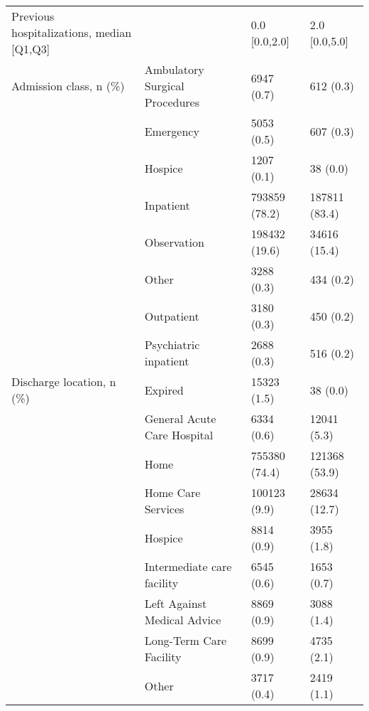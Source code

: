 \begin{tabular}{llll}
Previous hospitalizations, median [Q1,Q3] &   &                  0.0 [0.0,2.0] &     2.0 [0.0,5.0] \\
Admission class, n (\%) & Ambulatory Surgical Procedures &                     6947 (0.7) &         612 (0.3) \\
                                       & Emergency &                     5053 (0.5) &         607 (0.3) \\
                                       & Hospice &                     1207 (0.1) &          38 (0.0) \\
                                       & Inpatient &                  793859 (78.2) &     187811 (83.4) \\
                                       & Observation &                  198432 (19.6) &      34616 (15.4) \\
                                       & Other &                     3288 (0.3) &         434 (0.2) \\
                                       & Outpatient &                     3180 (0.3) &         450 (0.2) \\
                                       & Psychiatric inpatient &                     2688 (0.3) &         516 (0.2) \\
Discharge location, n (\%) & Expired &                    15323 (1.5) &          38 (0.0) \\
                                       & General Acute Care Hospital &                     6334 (0.6) &       12041 (5.3) \\
                                       & Home &                  755380 (74.4) &     121368 (53.9) \\
                                       & Home Care Services &                   100123 (9.9) &      28634 (12.7) \\
                                       & Hospice &                     8814 (0.9) &        3955 (1.8) \\
                                       & Intermediate care facility &                     6545 (0.6) &        1653 (0.7) \\
                                       & Left Against Medical Advice &                     8869 (0.9) &        3088 (1.4) \\
                                       & Long-Term Care Facility &                     8699 (0.9) &        4735 (2.1) \\
                                       & Other &                     3717 (0.4) &        2419 (1.1) \\

\end{tabular}
